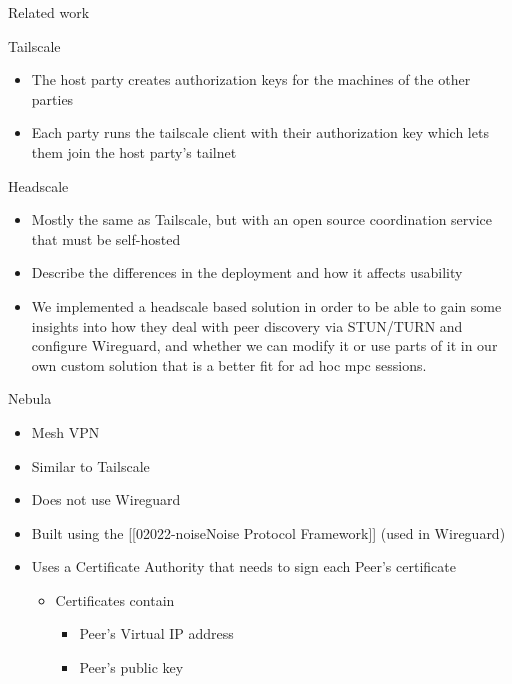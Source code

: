 \begin{frame}[fragile]{Related work}
\begin{block}{Tailscale}
\begin{itemize}
\begin{itemize}
    \begin{itemize}
    \tightlist
    \item
      The host party creates authorization keys for the machines of the
      other parties
    \item
      Each party runs the tailscale client with their authorization key
      which lets them join the host party's tailnet
    \end{itemize}
  \end{itemize}
\end{itemize}
\end{block}

\begin{block}{Headscale}
\protect\hypertarget{headscale}{}
\begin{itemize}
\tightlist
\item
  Mostly the same as Tailscale, but with an open source coordination
  service that must be self-hosted
\item
  Describe the differences in the deployment and how it affects
  usability
\item
  We implemented a headscale based solution in order to be able to gain
  some insights into how they deal with peer discovery via STUN/TURN and
  configure Wireguard, and whether we can modify it or use parts of it
  in our own custom solution that is a better fit for ad hoc mpc
  sessions.
\end{itemize}
\end{block}

\begin{block}{Nebula}
\protect\hypertarget{nebula}{}
\begin{itemize}
\tightlist
\item
  Mesh VPN
\item
  Similar to Tailscale
\item
  Does not use Wireguard
\item
  Built using the {[}{[}02022-noise\textbar Noise Protocol
  Framework{]}{]} (used in Wireguard)
\item
  Uses a Certificate Authority that needs to sign each Peer's
  certificate

  \begin{itemize}
  \tightlist
  \item
    Certificates contain

    \begin{itemize}
    \tightlist
    \item
      Peer's Virtual IP address
    \item
      Peer's public key
    \end{itemize}
  \end{itemize}
\end{itemize}
\end{block}


\end{frame}
